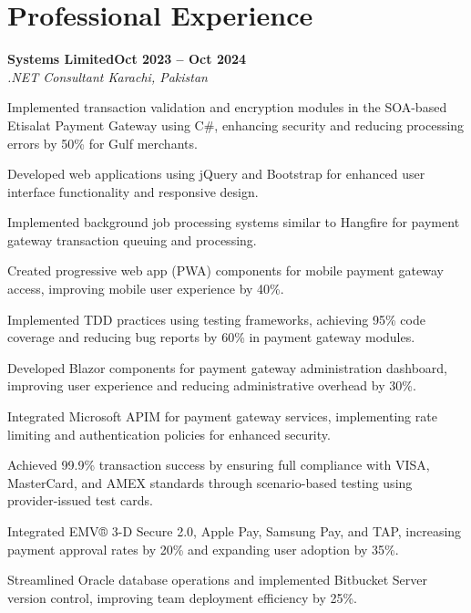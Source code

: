 \documentclass[letterpaper,10pt]{article}
\newcommand{\headingBf}[2]{
  \hspace{10pt}\textbf{#1}\hfill\textbf{#2}\\
}
\newcommand{\headingIt}[2]{
  \hspace{10pt}\textit{#1}\hfill\textit{#2}\\
}
\newenvironment{resume_list}{
  \vspace{-7pt}
  \begin{itemize}[itemsep=-2px, parsep=1pt, leftmargin=30pt]
}{
  \end{itemize}
}
\begin{document}
\section{Professional Experience}

\headingBf{Systems Limited}{Oct 2023 -- Oct 2024}
\headingIt{.NET Consultant \hfill Karachi, Pakistan}{}
\begin{resume_list}
    \item Implemented transaction validation and encryption modules in the SOA-based Etisalat Payment Gateway using C\#, enhancing security and reducing processing errors by 50\% for Gulf merchants.
    \item Developed web applications using jQuery and Bootstrap for enhanced user interface functionality and responsive design.
    \item Implemented background job processing systems similar to Hangfire for payment gateway transaction queuing and processing.
    \item Created progressive web app (PWA) components for mobile payment gateway access, improving mobile user experience by 40\%.
    \item Implemented TDD practices using testing frameworks, achieving 95\% code coverage and reducing bug reports by 60\% in payment gateway modules.
    \item Developed Blazor components for payment gateway administration dashboard, improving user experience and reducing administrative overhead by 30\%.
    \item Integrated Microsoft APIM for payment gateway services, implementing rate limiting and authentication policies for enhanced security.
    \item Achieved 99.9\% transaction success by ensuring full compliance with VISA, MasterCard, and AMEX standards through scenario-based testing using provider-issued test cards.
    \item Integrated EMV® 3-D Secure 2.0, Apple Pay, Samsung Pay, and TAP, increasing payment approval rates by 20\% and expanding user adoption by 35\%.
    \item Streamlined Oracle database operations and implemented Bitbucket Server version control, improving team deployment efficiency by 25\%.
\end{resume_list}
\end{document}
